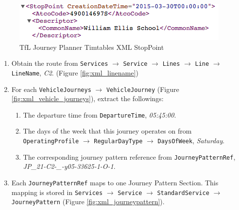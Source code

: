 \begin{figure}
\centering
\includegraphics[width=\textwidth]{figures/xml_stoppoint.png}
\caption{\label{fig:xml_stoppoint} TfL Journey Planner Timtables XML StopPoint}
\end{figure}

\begin{enumerate}
  \item Obtain the route from \texttt{Services} $\rightarrow$ \texttt{Service} $\rightarrow$ \texttt{Lines} $\rightarrow$ \texttt{Line} $\rightarrow$ \texttt{LineName}, \textit{C2}. (Figure \ref{fig:xml_linename})
  \item For each \texttt{VehicleJourneys} $\rightarrow$ \texttt{VehicleJourney} (Figure \ref{fig:xml_vehicle_journeys}), extract the followings:
  \begin{enumerate}
    \item The departure time from \texttt{DepartureTime}, \textit{05:45:00}.
    \item The days of the week that this journey operates on from \texttt{OperatingProfile} $\rightarrow$ \texttt{RegularDayType} $\rightarrow$ \texttt{DaysOfWeek}, \textit{Saturday}.
    \item The corresponding journey pattern reference from \texttt{JourneyPatternRef}, \textit{JP\_21-C2-\_-y05-33625-1-O-1}.
  \end{enumerate}
  \item Each \texttt{JourneyPatternRef} maps to one Journey Pattern Section. This mapping is stored in \texttt{Services} $\rightarrow$ \texttt{Service} $\rightarrow$ \texttt{StandardService} $\rightarrow$ \texttt{JourneyPattern} (Figure \ref{fig:xml_journeypattern}).


\end{enumerate}
